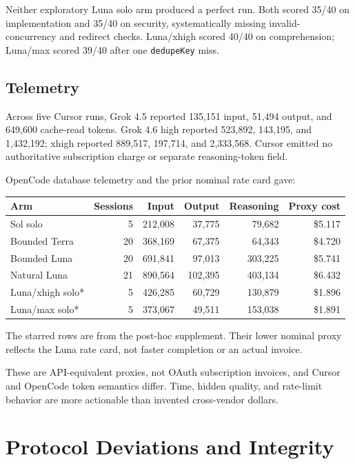 \documentclass[11pt,oneside]{article}
\begin{document}
Neither exploratory Luna solo arm produced a perfect run. Both scored 35/40 on
implementation and 35/40 on security, systematically missing invalid-
concurrency and redirect checks. Luna/xhigh scored 40/40 on comprehension;
Luna/max scored 39/40 after one \texttt{dedupeKey} miss.

\subsection{Telemetry}

Across five Cursor runs, Grok 4.5 reported 135,151 input, 51,494 output, and
649,600 cache-read tokens. Grok 4.6 high reported 523,892, 143,195, and
1,432,192; xhigh reported 889,517, 197,714, and 2,333,568. Cursor emitted no
authoritative subscription charge or separate reasoning-token field.

OpenCode database telemetry and the prior nominal rate card gave:

\begin{center}
\small
\begin{tabular}{@{}lrrrrr@{}}
\toprule
Arm & Sessions & Input & Output & Reasoning & Proxy cost \\
\midrule
Sol solo & 5 & 212,008 & 37,775 & 79,682 & \$5.117 \\
Bounded Terra & 20 & 368,169 & 67,375 & 64,343 & \$4.720 \\
Bounded Luna & 20 & 691,841 & 97,013 & 303,225 & \$5.741 \\
Natural Luna & 21 & 890,564 & 102,395 & 403,134 & \$6.432 \\
Luna/xhigh solo* & 5 & 426,285 & 60,729 & 130,879 & \$1.896 \\
Luna/max solo* & 5 & 373,067 & 49,511 & 153,038 & \$1.891 \\
\bottomrule
\end{tabular}
\end{center}

The starred rows are from the post-hoc supplement. Their lower nominal proxy
reflects the Luna rate card, not faster completion or an actual invoice.

These are API-equivalent proxies, not OAuth subscription invoices, and Cursor
and OpenCode token semantics differ. Time, hidden quality, and rate-limit
behavior are more actionable than invented cross-vendor dollars.

\section{Protocol Deviations and Integrity}
\end{document}

